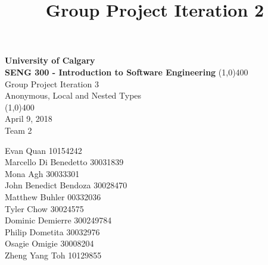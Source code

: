 \documentclass[12p]{article}
\title{\vspace{-6ex}Group Project Iteration 2}
\date{\vspace{-12ex}}
\begin{document}
\thispagestyle{fancy}

\begin{titlepage}
  \begin{center}
    \vspace{1cm}
    \Large{\textbf{University of Calgary}}\\
    \Large{\textbf{SENG 300  - Introduction to Software Engineering}}
    \vfill
    \line(1,0){400}\\[1mm]
    \huge{Group Project Iteration 3}\\
    \large{Anonymous, Local and Nested Types}\\
    \line(1,0){400}\\
    \Large April 9, 2018\\
    \vfill
    \huge{Team 2}\\
    \large
    \begin{multicols}{2}
      Evan Quan 10154242\\
      Marcello Di Benedetto 30031839\\
      Mona Agh 30033301\\
      John Benedict Bendoza 30028470\\
      Matthew Buhler 00332036\\
      Tyler Chow 30024575\\
      Dominic Demierre 300249784\\
      Philip Dometita 30032976\\
      Osagie Omigie 30008204\\
      Zheng Yang Toh 10129855\\
    \end{multicols}
  \end{center}
\end{titlepage}

\tableofcontents
\thispagestyle{empty}
\clearpage

\onehalfspacing

\setcounter{page}{1}

\end{document}
